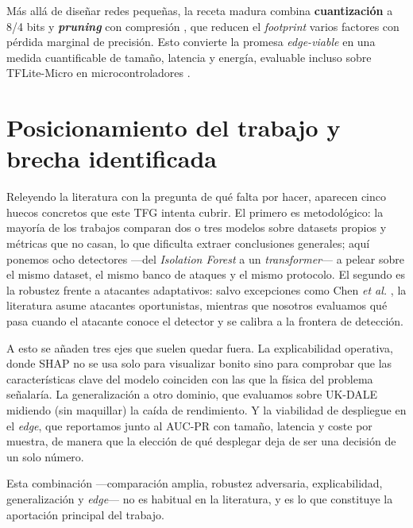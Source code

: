 Más allá de diseñar redes pequeñas, la receta madura combina \textbf{cuantización} a 8/4 bits \cite{jacob2018quantization} y \textbf{\textit{pruning}} con compresión \cite{han2016deepcompression}, que reducen el \textit{footprint} varios factores con pérdida marginal de precisión. Esto convierte la promesa \emph{edge-viable} en una medida cuantificable de tamaño, latencia y energía, evaluable incluso sobre TFLite-Micro en microcontroladores \cite{nguyen2023tiny}.

\section{Posicionamiento del trabajo y brecha identificada}
\label{sec:soa-brecha}

Releyendo la literatura con la pregunta de qué falta por hacer, aparecen cinco huecos concretos que este TFG intenta cubrir. El primero es metodológico: la mayoría de los trabajos comparan dos o tres modelos sobre datasets propios y métricas que no casan, lo que dificulta extraer conclusiones generales; aquí ponemos ocho detectores ---del \textit{Isolation Forest} a un \textit{transformer}--- a pelear sobre el mismo dataset, el mismo banco de ataques y el mismo protocolo. El segundo es la robustez frente a atacantes adaptativos: salvo excepciones como Chen \emph{et al.} \cite{chen2018adversarial}, la literatura asume atacantes oportunistas, mientras que nosotros evaluamos qué pasa cuando el atacante conoce el detector y se calibra a la frontera de detección.

A esto se añaden tres ejes que suelen quedar fuera. La explicabilidad operativa, donde SHAP no se usa solo para visualizar bonito sino para comprobar que las características clave del modelo coinciden con las que la física del problema señalaría. La generalización a otro dominio, que evaluamos sobre UK-DALE midiendo (sin maquillar) la caída de rendimiento. Y la viabilidad de despliegue en el \textit{edge}, que reportamos junto al AUC-PR con tamaño, latencia y coste por muestra, de manera que la elección de qué desplegar deja de ser una decisión de un solo número.

Esta combinación ---comparación amplia, robustez adversaria, explicabilidad, generalización y \textit{edge}--- no es habitual en la literatura, y es lo que constituye la aportación principal del trabajo.
